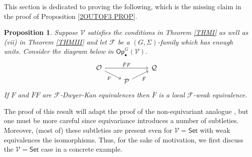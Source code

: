 \documentclass[a4paper,10pt
,draft
]{article}%
\numberwithin{equation}{section}
\numberwithin{figure}{section}
\newtheorem{proposition}[equation]{Proposition}%
\theoremstyle{definition} %
\newcommand{\F}{\ensuremath{\mathcal F}}
\newcommand{\V}{\ensuremath{\mathcal V}}
\renewcommand{\O}{\ensuremath{\mathcal O}}
\newcommand{\1}{\ensuremath{\mathbbm 1}}%
\begin{document}
This section is dedicated to proving the following, 
which is the missing claim in the proof of Proposition \ref{2OUTOF3 PROP}.


\begin{proposition}\label{23HARDCASE PROP}
Suppose $\V$ satisfies the conditions in Theorem \ref{THMI} as well as 
(vii) in Theorem \ref{THMIII} and 
let $\F$ be a $(G,\Sigma)$-family which has enough units. 
%
Consider the diagram below 
in $\mathsf{Op}^G_\bullet(\V)$.
\begin{equation}\label{23HARDDIAG EQ}
	\begin{tikzcd}[row sep=5pt]
		\O \arrow{rr}{\bar{F}F}
		\arrow{dr}[swap]{F}
	&&
		\mathcal{Q} 
	\\
	&
		\mathcal{P} \ar{ru}[swap]{\bar{F}}
	\end{tikzcd}
\end{equation}
If $F$ and $\bar{F}F$ are $\F$-Dwyer-Kan equivalences
then $\bar{F}$ is a local $\F$-weak equivalence.
\end{proposition}



The proof of this result will adapt the proof of the non-equivariant analogue \cite[Lemma 4.14]{Cav},
but one must be more careful since equivariance introduces a number of subtleties.
Moreover, (most of) these subtleties are
present even for $\V = \mathsf{Set}$
with weak equivalences the isomorphisms.
Thus, for the sake of motivation, 
we first discuss the $\V = \mathsf{Set}$ case
in a concrete example.
\end{document}
